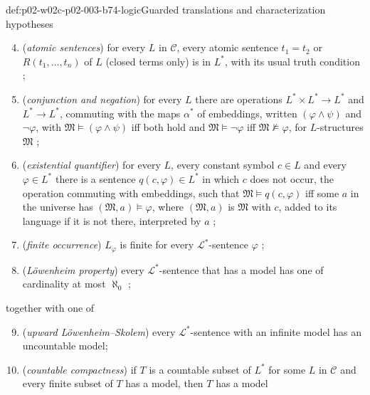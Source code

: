\begin{hbdefinition}{def:p02-w02c-p02-003-b74-logic}{Guarded translations and characterization hypotheses}
\begin{enumerate}\setcounter{enumi}{3}
\item (\emph{atomic sentences}) for every \(L\) in \(\mathcal C\), every
      atomic sentence \(t_1=t_2\) or \(R(t_1,\ldots,t_n)\) of \(L\) (closed
      terms only) is in \(L^{\ast}\), with its usual truth condition
      \cite[Part~I, \S8, p.~237]{Barwise1974Axioms};
\item (\emph{conjunction and negation}) for every \(L\) there are
      operations \(L^{\ast}\times L^{\ast}\to L^{\ast}\) and
      \(L^{\ast}\to L^{\ast}\), commuting with the maps \(\alpha^{\ast}\) of
      embeddings, written \((\varphi\land\psi)\) and \(\neg\varphi\), with
      \(\mathfrak M\models(\varphi\land\psi)\) iff both hold and
      \(\mathfrak M\models\neg\varphi\) iff \(\mathfrak M\not\models\varphi\),
      for \(L\)-structures \(\mathfrak M\) \cite[Part~I, \S9, 9.1, 9.9,
      pp.~238, 242]{Barwise1974Axioms};
\item (\emph{existential quantifier}) for every \(L\), every constant
      symbol \(c\in L\) and every \(\varphi\in L^{\ast}\) there is a sentence
      \(q(c,\varphi)\in L^{\ast}\) in which \(c\) does not occur, the
      operation commuting with embeddings, such that
      \(\mathfrak M\models q(c,\varphi)\) iff some \(a\) in the universe has
      \((\mathfrak M,a)\models\varphi\), where \((\mathfrak M,a)\) is
      \(\mathfrak M\) with \(c\), added to its language if it is not there,
      interpreted by \(a\) \cite[Part~I, \S9,
      9.3, 9.7, pp.~239, 241]{Barwise1974Axioms};
\item (\emph{finite occurrence}) \(L_\varphi\) is finite for every
      \(\mathcal L^{\ast}\)-sentence \(\varphi\)
      \cite[Part~II, \S2, p.~254]{Barwise1974Axioms};
\item (\emph{L\"owenheim property}) every \(\mathcal L^{\ast}\)-sentence that
      has a model has one of cardinality at most \(\aleph_0\)
      \cite[Part~II, \S2, p.~255]{Barwise1974Axioms};
\end{enumerate}
together with one of
\begin{enumerate}\setcounter{enumi}{8}
\item[(a)] (\emph{upward L\"owenheim--Skolem}) every
      \(\mathcal L^{\ast}\)-sentence with an infinite model has an
      uncountable model;
\item[(b)] (\emph{countable compactness}) if \(T\) is a countable subset of
      \(L^{\ast}\) for some \(L\) in \(\mathcal C\) and every finite subset
      of \(T\) has a model, then \(T\) has a model

\end{enumerate}
\end{hbdefinition}
